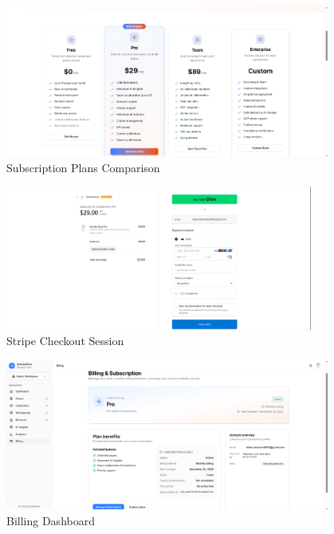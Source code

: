 \begin{figure}[H]
\centering
\includegraphics[width=0.95\textwidth]{images/screenshots/billing_plan.png}
\caption{Subscription Plans Comparison}
\label{fig:screenshot-billing-plans}
\end{figure}

\begin{figure}[H]
\centering
\includegraphics[width=0.9\textwidth]{images/screenshots/stripe_checkout.png}
\caption{Stripe Checkout Session}
\label{fig:screenshot-stripe-checkout}
\end{figure}

\begin{figure}[H]
\centering
\includegraphics[width=0.95\textwidth]{images/screenshots/billing_dashboard.png}
\caption{Billing Dashboard}
\label{fig:screenshot-billing-dashboard}
\end{figure}


